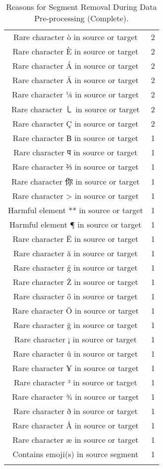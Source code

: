 \begin{longtable}{cc}
Rare character ò in source or target & 2 \\
Rare character È in source or target & 2 \\
Rare character Á in source or target & 2 \\
Rare character Â in source or target & 2 \\
Rare character ¼ in source or target & 2 \\
Rare character ㇄ in source or target & 2 \\
Rare character Ç in source or target & 2 \\
Rare character В in source or target & 1 \\
Rare character प in source or target & 1 \\
Rare character ⅔ in source or target & 1 \\
Rare character 你 in source or target & 1 \\
Rare character > in source or target & 1 \\
Harmful element ** in source or target & 1 \\
Harmful element ¶ in source or target & 1 \\
Rare character Ë in source or target & 1 \\
Rare character ă in source or target & 1 \\
Rare character ǵ in source or target & 1 \\
Rare character Ż in source or target & 1 \\
Rare character ő in source or target & 1 \\
Rare character Ō in source or target & 1 \\
Rare character ğ in source or target & 1 \\
Rare character ¡ in source or target & 1 \\
Rare character û in source or target & 1 \\
Rare character ¥ in source or target & 1 \\
Rare character ³ in source or target & 1 \\
Rare character ¾ in source or target & 1 \\
Rare character ð in source or target & 1 \\
Rare character Å in source or target & 1 \\
Rare character æ in source or target & 1 \\
Contains emoji(s) in source segment & 1 \\
\bottomrule 
\caption{Reasons for Segment Removal During Data Pre-processing (Complete).} 
\end{longtable}




